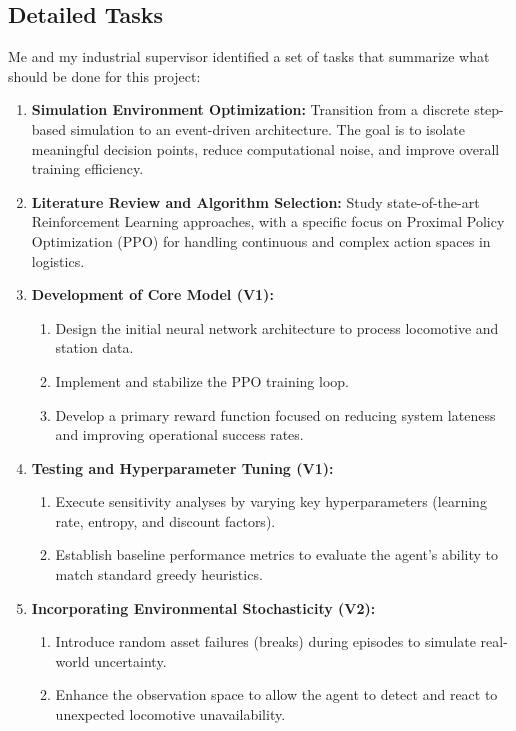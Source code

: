 \documentclass[a4paper]{scrartcl}
\begin{document}
\subsection{Detailed Tasks}
Me and my industrial supervisor identified a set of tasks that summarize what should be done for this project:
\begin{enumerate}
    \item \textbf{Simulation Environment Optimization:} Transition from a discrete step-based simulation to an event-driven architecture. The goal is to isolate meaningful decision points, reduce computational noise, and improve overall training efficiency.
    
    \item \textbf{Literature Review and Algorithm Selection:} Study state-of-the-art Reinforcement Learning approaches, with a specific focus on Proximal Policy Optimization (PPO) for handling continuous and complex action spaces in logistics.
    
    \item \textbf{Development of Core Model (V1):}
    \begin{enumerate}
        \item Design the initial neural network architecture to process locomotive and station data.
        \item Implement and stabilize the PPO training loop.
        \item Develop a primary reward function focused on reducing system lateness and improving operational success rates.
    \end{enumerate}
    
    \item \textbf{Testing and Hyperparameter Tuning (V1):}
    \begin{enumerate}
        \item Execute sensitivity analyses by varying key hyperparameters (learning rate, entropy, and discount factors).
        \item Establish baseline performance metrics to evaluate the agent's ability to match standard greedy heuristics.
    \end{enumerate}
    
    \item \textbf{Incorporating Environmental Stochasticity (V2):}
    \begin{enumerate}
        \item Introduce random asset failures (breaks) during episodes to simulate real-world uncertainty.
        \item Enhance the observation space to allow the agent to detect and react to unexpected locomotive unavailability.
    \end{enumerate}
    

\end{enumerate}
\end{document}
